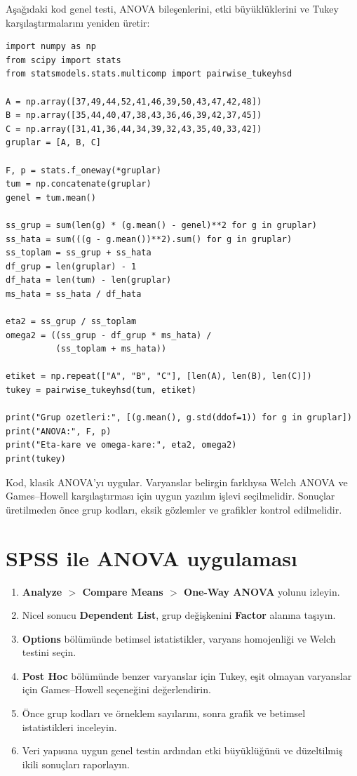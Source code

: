 Aşağıdaki kod genel testi, ANOVA bileşenlerini, etki büyüklüklerini ve Tukey
karşılaştırmalarını yeniden üretir:

\begin{lstlisting}
import numpy as np
from scipy import stats
from statsmodels.stats.multicomp import pairwise_tukeyhsd

A = np.array([37,49,44,52,41,46,39,50,43,47,42,48])
B = np.array([35,44,40,47,38,43,36,46,39,42,37,45])
C = np.array([31,41,36,44,34,39,32,43,35,40,33,42])
gruplar = [A, B, C]

F, p = stats.f_oneway(*gruplar)
tum = np.concatenate(gruplar)
genel = tum.mean()

ss_grup = sum(len(g) * (g.mean() - genel)**2 for g in gruplar)
ss_hata = sum(((g - g.mean())**2).sum() for g in gruplar)
ss_toplam = ss_grup + ss_hata
df_grup = len(gruplar) - 1
df_hata = len(tum) - len(gruplar)
ms_hata = ss_hata / df_hata

eta2 = ss_grup / ss_toplam
omega2 = ((ss_grup - df_grup * ms_hata) /
          (ss_toplam + ms_hata))

etiket = np.repeat(["A", "B", "C"], [len(A), len(B), len(C)])
tukey = pairwise_tukeyhsd(tum, etiket)

print("Grup ozetleri:", [(g.mean(), g.std(ddof=1)) for g in gruplar])
print("ANOVA:", F, p)
print("Eta-kare ve omega-kare:", eta2, omega2)
print(tukey)
\end{lstlisting}

Kod, klasik ANOVA'yı uygular. Varyanslar belirgin farklıysa Welch ANOVA ve
Games--Howell karşılaştırması için uygun yazılım işlevi seçilmelidir. Sonuçlar
üretilmeden önce grup kodları, eksik gözlemler ve grafikler kontrol edilmelidir.

\section{SPSS ile ANOVA uygulaması}

\begin{enumerate}
  \item \textbf{Analyze $>$ Compare Means $>$ One-Way ANOVA} yolunu izleyin.
  \item Nicel sonucu \textbf{Dependent List}, grup değişkenini \textbf{Factor} alanına taşıyın.
  \item \textbf{Options} bölümünde betimsel istatistikler, varyans homojenliği ve Welch testini seçin.
  \item \textbf{Post Hoc} bölümünde benzer varyanslar için Tukey, eşit olmayan varyanslar için Games--Howell seçeneğini değerlendirin.
  \item Önce grup kodları ve örneklem sayılarını, sonra grafik ve betimsel istatistikleri inceleyin.
  \item Veri yapısına uygun genel testin ardından etki büyüklüğünü ve düzeltilmiş ikili sonuçları raporlayın.
\end{enumerate}

